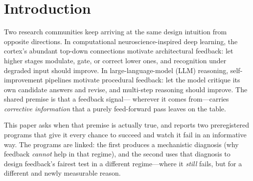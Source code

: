 \documentclass[10pt]{article}
\begin{document}
\begin{abstract}
\emph{hypothesis maintenance}---an explicit instruction to keep $\ge 3$
ranked candidates while evidence is thin---raises early-stage candidate-set
recall by $+12$ to $+33$\,pp and retains its advantage at the final stage.
Self-critique's apparent benefit decomposes into an
\emph{early-convergence} effect: it wins at intermediate evidence stages
($p < 10^{-4}$) but not at the endgame, and its sign reverses from
$+17$\,pp on hard puzzles to $-16$\,pp on medium ones. We conclude that
guidance-based feedback has no endgame value in either regime tested, while
hypothesis maintenance is a cheap, replicable alternative whose benefit
concentrates exactly where feedback is presumed to act---early, under
evidence scarcity.
\end{abstract}

\section{Introduction}
\label{sec:intro}

Two research communities keep arriving at the same design intuition from
opposite directions. In computational neuroscience-inspired deep learning,
the cortex's abundant top-down connections
\citep{rao1999predictive,friston2010free} motivate architectural feedback:
let higher stages modulate, gate, or correct lower ones, and recognition
under degraded input should improve. In large-language-model (LLM) reasoning,
self-improvement pipelines
\citep{madaan2023selfrefine,yao2023tree} motivate procedural feedback: let
the model critique its own candidate answers and revise, and multi-step
reasoning should improve. The shared premise is that a feedback signal---%
wherever it comes from---carries \emph{corrective information} that a purely
feed-forward pass leaves on the table.

This paper asks when that premise is actually true, and reports two
preregistered programs that give it every chance to succeed and watch it
fail in an informative way. The programs are linked: the first produces a
mechanistic diagnosis (why feedback \emph{cannot} help in that regime), and
the second uses that diagnosis to design feedback's fairest test in a
different regime---where it \emph{still} fails, but for a different and
newly measurable reason.
\end{document}
